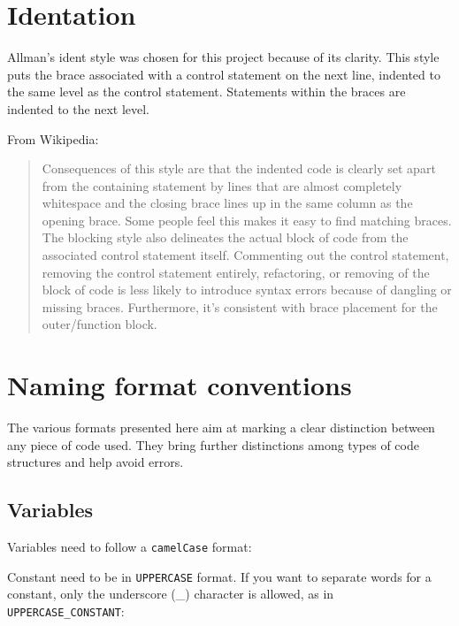 \section{Identation}
  Allman's ident style was chosen for this project because of its clarity. 
  This style puts the brace associated with a control statement on the next 
  line, indented to the same level as the control statement. Statements within 
  the braces are indented to the next level.
  
  
  From Wikipedia:
  
  \begin{quote}
  Consequences of this style are that the indented code is clearly set apart 
  from the containing statement by lines that are almost completely whitespace 
  and the closing brace lines up in the same column as the opening brace. Some 
  people feel this makes it easy to find matching braces. The blocking style 
  also delineates the actual block of code from the associated control 
  statement itself. Commenting out the control statement, removing the control 
  statement entirely, refactoring, or removing of the block of code is less 
  likely to introduce syntax errors because of dangling or missing braces. 
  Furthermore, it's consistent with brace placement for the outer/function 
  block.
  \end{quote}

\section{Naming format conventions}

The various formats presented here aim at marking a clear distinction between 
any piece of code used. They bring further distinctions among types of code 
structures and help avoid errors.

\subsection{Variables}

Variables need to follow a \texttt{camelCase} format:


Constant need to be in \texttt{UPPERCASE} format. If you want to separate words 
for a constant, only the underscore (\_) character is allowed, as in 
\texttt{UPPERCASE\_CONSTANT}:

